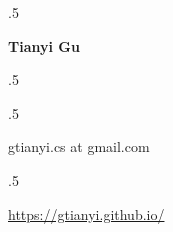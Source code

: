 \documentclass[margin, 10pt]{res} %
\begin{document}

\moveleft.5\hoffset\centerline{\large\bf Tianyi Gu}
\moveleft.5\hoffset\centerline{} 


 \moveleft.5\hoffset\centerline{gtianyi.cs at gmail.com}
 \moveleft.5\hoffset\centerline{\url{https://gtianyi.github.io/}}
\end{document}
